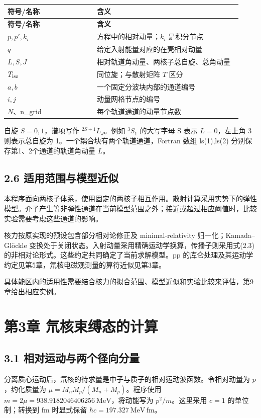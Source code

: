 \documentclass[UTF8,a4paper,zihao=5,fontset=fandol]{ctexart}
\begin{document}
{\small\setlength{\tabcolsep}{3pt}\renewcommand{\arraystretch}{1.28}
\begin{longtable}{@{}>{\raggedright\arraybackslash}p{0.3705\linewidth}>{\raggedright\arraybackslash}p{0.6045\linewidth}@{}}\toprule
\textbf{符号/名称} & \textbf{含义}\\\midrule
\endfirsthead
\textbf{符号/名称} & \textbf{含义}\\\midrule
\endhead
\(p,p',k_i\) & 方程中的相对动量；\(k_i\) 是积分节点\\
\(q\) & 给定入射能量对应的在壳相对动量\\
\(L,S,J\) & 相对轨道角动量、两核子总自旋、总角动量\\
\(T_{\rm iso}\) & 同位旋；与散射矩阵 \(T\) 区分\\
\(a,b\) & 一个固定分波块内部的通道编号\\
\(i,j\) & 动量网格节点的编号\\
\(N\)、{\ttfamily\small n\_\allowbreak{}grid} & 每个轨道通道的动量节点数\\
\bottomrule\end{longtable}}
自旋 \(S=0,1\)，谱项写作 \({}^{2S+1}L_J\)。例如 \({}^3S_1\) 的大写字母 S 表示 \(L=0\)，左上角 3 则表示总自旋为 1。一个耦合块有两个轨道通道，Fortran 数组 {\ttfamily\small ls(1),ls(2)} 分别保存第1、2个通道的轨道角动量 \(L\)。

\subsection*{2.6 适用范围与模型近似}
本程序面向两核子体系，使用固定的两核子相互作用。散射计算采用实势下的弹性模型。介子产生等非弹性通道在当前模型范围之外；接近或超过相应阈值时，比较实验需要考虑这些通道的影响。

核力按原实现的预设包含部分相对论修正及 minimal-relativity 归一化；Kamada–Glöckle 变换处于关闭状态。入射动量采用精确运动学换算，传播子则采用式(2.3)的非相对论形式。这些约定共同确定了当前求解模型。pp 的库仑处理及其运动学约定见第5章，氘核电磁观测量的算符近似见第3章。

具体能区内的适用性需要结合核力的拟合范围、模型近似和实验比较来评估，第9章给出相应实例。

\clearpage\section*{第3章 氘核束缚态的计算}
\subsection*{3.1 相对运动与两个径向分量}
分离质心运动后，氘核的待求量是中子与质子的相对运动波函数。令相对动量为 \(p\)，约化质量为 \(\mu=M_nM_p/(M_n+M_p)\)。程序使用 \(m=2\mu=938.9182046406256\ \mathrm{MeV}\)，将动能写为 \(p^2/m\)。这里采用 \(c=1\) 的单位制；转换到 fm 时显式保留 \(\hbar c=197.327\ \mathrm{MeV\,fm}\)。
\end{document}
